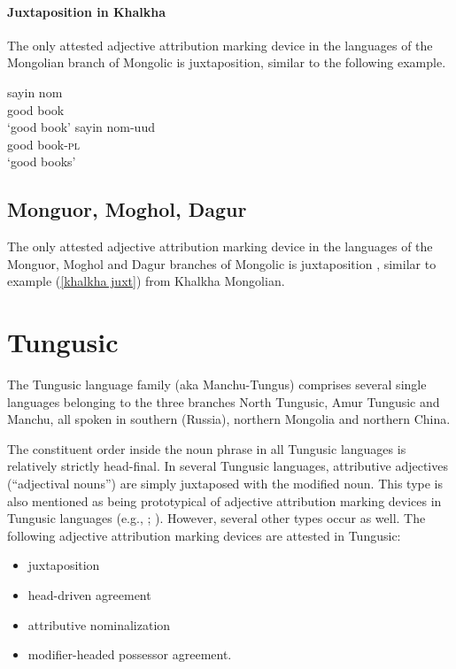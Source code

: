\paragraph*{Juxtaposition in Khalkha}\hspace{0.4cm}
The only attested adjective attribution marking device in the languages of the Mongolian branch of Mongolic is juxtaposition, similar to the following example.
\begin{exe}
\label{khalkha juxt}
\begin{xlist}
\ex
\gll	sayin nom\\
	good book\\
\glt	‘good book’
\ex 
\gll	sayin nom-uud\\
	good book-\textsc{pl}\\
\glt ‘good books’
\end{xlist}
\end{exe}

\subsection{Monguor, Moghol, Dagur}
The only attested adjective attribution marking device in the languages of the Monguor, Moghol and Dagur branches of Mongolic is juxtaposition \citep{slater2003,weiers2003,tsumagari2003}, similar to example (\ref{khalkha juxt}) from Khalkha Mongolian.

\section{Tungusic}
\label{tungusic synchr}
The Tungusic language family (aka Manchu-Tungus) comprises several single languages belonging to the three branches North Tungusic, Amur Tungusic and Manchu, all spoken in southern  (Russia), northern Mongolia and northern China.

The constituent order inside the noun phrase in all Tungusic languages is relatively strictly head-final. In several Tungusic languages, attributive adjectives (“adjectival nouns”) are simply juxtaposed with the modified noun. This type is also mentioned as being prototypical of adjective attribution marking devices in Tungusic languages (e.g., \citealt{sunik1968a}; \citealt[133]{kormusin2005}). However, several other types occur as well. The following adjective attribution marking devices are attested in Tungusic:
\begin{itemize}
\item juxtaposition
\item head\hyp{}driven agreement
\item attributive nominalization
\item modifier\hyp{}headed possessor agreement.
\end{itemize}

